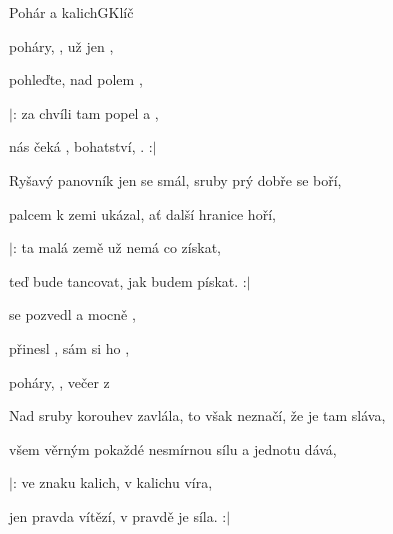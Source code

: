 \setcounter{page}{67}
\begin{song}{Pohár a kalich}{G}{Klíč}

\begin{SBVerse}

 poháry, , už jen   ,

pohleďte, nad polem    ,

$|$: za chvíli  tam popel a ,

   nás čeká , bohatství, . :$|$

\end{SBVerse}

\begin{SBVerse}

Ryšavý panovník jen se smál, sruby prý dobře se boří,

palcem k zemi ukázal, ať další hranice hoří,

$|$: ta malá země už nemá co získat,

   teď bude tancovat, jak budem pískat. :$|$

\end{SBVerse}

\begin{SBChorus}

 se pozvedl  a mocně ,

 přinesl , sám si ho ,


 poháry, , večer z   

\end{SBChorus}

\begin{SBVerse}

Nad sruby korouhev zavlála, to však neznačí, že je tam sláva,

všem věrným pokaždé nesmírnou sílu a jednotu dává,

$|$: ve znaku kalich, v kalichu víra,

   jen pravda vítězí, v pravdě je síla. :$|$

\end{SBVerse}

\begin{SBVerse}


\end{SBVerse}
\end{song}
